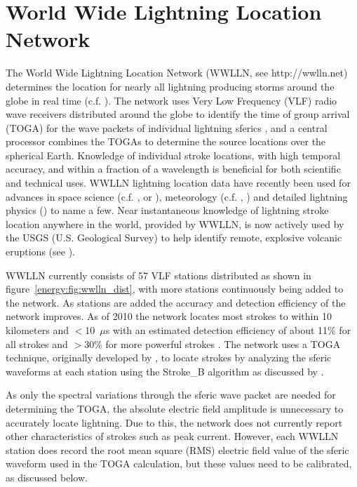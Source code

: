 \section{World Wide Lightning Location Network}

The World Wide Lightning Location Network (WWLLN, see http://wwlln.net) determines the location for nearly all lightning producing storms around the globe in real time (c.f. \citet{Jacobson2006c}).
The network uses Very Low Frequency (VLF) radio wave receivers distributed around the globe to identify the time of group arrival (TOGA) for the wave packets of individual lightning sferics \citep{Dowden2002d}, and a central processor combines the TOGAs to determine the source locations over the spherical Earth.
Knowledge of individual stroke locations, with high temporal accuracy, and within a fraction of a wavelength is beneficial for both scientific and technical uses. WWLLN lightning location data have recently been used for advances in space science (c.f. \citet{Kumar2009}, or \citet{Holzworth2011}), meteorology (c.f. \citet{Price2009}, \citet{Thomas2010d}) and detailed lightning physics (\citet{Connaughton2010a}) to name a few.
Near instantaneous knowledge of lightning stroke location anywhere in the world, provided by WWLLN, is now actively used by the USGS (U.S. Geological Survey) to help identify remote, explosive volcanic eruptions (see \citet{Doughton2010}).

WWLLN currently consists of 57 VLF stations distributed as shown in figure~\ref{energy:fig:wwlln_dist}, with more stations continuously being added to the network.
As stations are added the accuracy and detection efficiency of the network improves. As of 2010 the network locates most strokes to within 10 kilometers and $<$10~$\mu$s with an estimated detection efficiency of about 11\% for all strokes and $>$30\% for more powerful strokes \citep{Abarca2010,Rodger2009}.
The network uses a TOGA technique, originally developed by \citet{Dowden2000}, to locate strokes by analyzing the sferic waveforms at each station using the Stroke\_B algorithm as discussed by \citet{Rodger2006,Rodger2009}.

As only the spectral variations through the sferic wave packet are needed for determining the TOGA, the absolute electric field amplitude is unnecessary to accurately locate lightning. Due to this, the network does not currently report other characteristics of strokes such as peak current.
However, each WWLLN station does record the root mean square (RMS) electric field value of the sferic waveform used in the TOGA calculation, but these values need to be calibrated, as discussed below.

